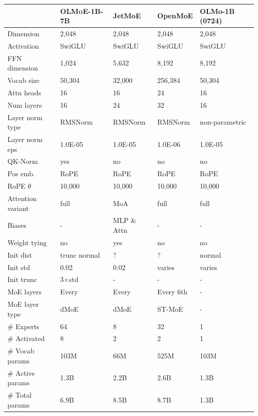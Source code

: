 \documentclass{article}
\newcommand{\modelsmall}{\textbf{\textsc{OLMoE-1B-7B}}}
\begin{document}
\begin{table}[htbp]
\centering
\begin{tabular}{l|lll|l}
\toprule
& \modelsmall{} & \textbf{JetMoE} & \textbf{OpenMoE} & \textbf{OLMo-1B (0724)} \\
\midrule
Dimension & 2,048 & 2,048 & 2,048 & 2,048 \\
Activation & SwiGLU & SwiGLU & SwiGLU & SwiGLU \\
\rowcolor{lightOlmoeYellow}
FFN dimension & 1,024 & 5,632 & 8,192 & 8,192 \\
Vocab size & 50,304 & 32,000 & 256,384 & 50,304 \\
Attn heads & 16 & 16 & 24 & 16 \\
Num layers & 16 & 24 & 32 & 16 \\
\rowcolor{lightOlmoeYellow}
Layer norm type & RMSNorm & RMSNorm & RMSNorm & non-parametric \\
Layer norm eps & 1.0E-05 & 1.0E-05 & 1.0E-06 & 1.0E-05 \\
\rowcolor{lightOlmoeYellow}
QK-Norm & yes & no & no & no \\
Pos emb. & RoPE & RoPE & RoPE & RoPE \\
RoPE $\theta$ & 10,000 & 10,000 & 10,000 & 10,000 \\
Attention variant & full & MoA & full & full \\
Biases & - & MLP \& Attn & - & - \\
Weight tying\nocite{press2017usingoutputembeddingimprove} & no & yes & no & no \\
\rowcolor{lightOlmoeYellow}
Init dist & trunc normal & ? & ? & normal \\
\rowcolor{lightOlmoeYellow}
Init std & 0.02 & 0.02 & varies & varies \\
\rowcolor{lightOlmoeYellow}
Init trunc & 3$\times$std & - & - & - \\
\rowcolor{lightOlmoeYellow}
MoE layers & Every & Every & Every 6th & - \\
\rowcolor{lightOlmoeYellow}
MoE layer type & dMoE & dMoE & ST-MoE & - \\
\rowcolor{lightOlmoeYellow}
\# Experts & 64 & 8 & 32 & 1 \\
\rowcolor{lightOlmoeYellow}
\# Activated & 8 & 2 & 2 & 1 \\
\midrule
\# Vocab params & 103M & 66M & 525M & 103M \\
\# Active params & 1.3B & 2.2B & 2.6B & 1.3B \\
\rowcolor{lightOlmoeYellow}
\# Total params & 6.9B & 8.5B & 8.7B & 1.3B \\

\end{tabular}
\end{table}
\end{document}
